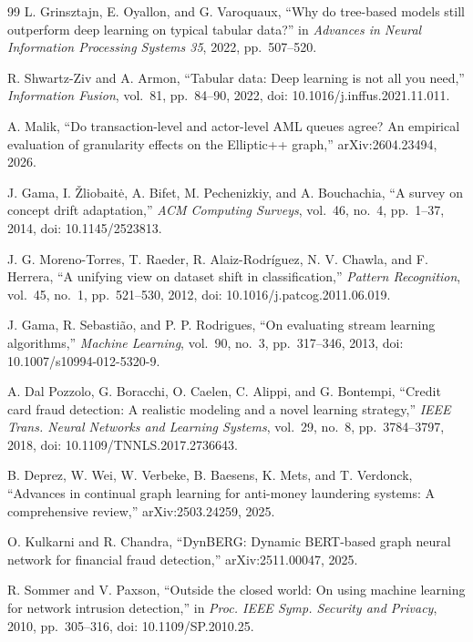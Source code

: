 \documentclass[conference]{IEEEtran}
\begin{document}
\begin{thebibliography}{99}
 L. Grinsztajn, E. Oyallon, and G. Varoquaux, ``Why do tree-based models still outperform deep learning on typical tabular data?'' in \emph{Advances in Neural Information Processing Systems 35}, 2022, pp.~507--520.

 R. Shwartz-Ziv and A. Armon, ``Tabular data: Deep learning is not all you need,'' \emph{Information Fusion}, vol.~81, pp.~84--90, 2022, doi: 10.1016/j.inffus.2021.11.011.

 A. Malik, ``Do transaction-level and actor-level AML queues agree? An empirical evaluation of granularity effects on the Elliptic++ graph,'' arXiv:2604.23494, 2026.

 J. Gama, I. \v{Z}liobait\.e, A. Bifet, M. Pechenizkiy, and A. Bouchachia, ``A survey on concept drift adaptation,'' \emph{ACM Computing Surveys}, vol.~46, no.~4, pp.~1--37, 2014, doi: 10.1145/2523813.

 J. G. Moreno-Torres, T. Raeder, R. Alaiz-Rodr\'iguez, N. V. Chawla, and F. Herrera, ``A unifying view on dataset shift in classification,'' \emph{Pattern Recognition}, vol.~45, no.~1, pp.~521--530, 2012, doi: 10.1016/j.patcog.2011.06.019.

 J. Gama, R. Sebasti\~ao, and P. P. Rodrigues, ``On evaluating stream learning algorithms,'' \emph{Machine Learning}, vol.~90, no.~3, pp.~317--346, 2013, doi: 10.1007/s10994-012-5320-9.

 A. Dal Pozzolo, G. Boracchi, O. Caelen, C. Alippi, and G. Bontempi, ``Credit card fraud detection: A realistic modeling and a novel learning strategy,'' \emph{IEEE Trans. Neural Networks and Learning Systems}, vol.~29, no.~8, pp.~3784--3797, 2018, doi: 10.1109/TNNLS.2017.2736643.

 B. Deprez, W. Wei, W. Verbeke, B. Baesens, K. Mets, and T. Verdonck, ``Advances in continual graph learning for anti-money laundering systems: A comprehensive review,'' arXiv:2503.24259, 2025.

 O. Kulkarni and R. Chandra, ``DynBERG: Dynamic BERT-based graph neural network for financial fraud detection,'' arXiv:2511.00047, 2025.

 R. Sommer and V. Paxson, ``Outside the closed world: On using machine learning for network intrusion detection,'' in \emph{Proc. IEEE Symp. Security and Privacy}, 2010, pp.~305--316, doi: 10.1109/SP.2010.25.


\end{thebibliography}
\end{document}
